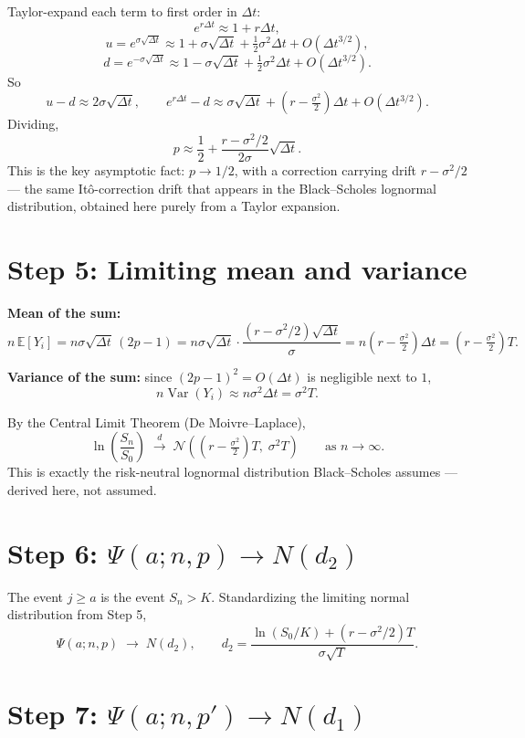 \documentclass[11pt]{article}
\begin{document}
Taylor-expand each term to first order in $\Delta t$:
\[
  e^{r\Delta t} \approx 1 + r\Delta t,
\]
\[
  u = e^{\sigma\sqrt{\Delta t}} \approx 1 + \sigma\sqrt{\Delta t} + \tfrac{1}{2}\sigma^2 \Delta t + O(\Delta t^{3/2}),
\]
\[
  d = e^{-\sigma\sqrt{\Delta t}} \approx 1 - \sigma\sqrt{\Delta t} + \tfrac{1}{2}\sigma^2 \Delta t + O(\Delta t^{3/2}).
\]
So
\[
  u - d \approx 2\sigma\sqrt{\Delta t}, \qquad
  e^{r\Delta t} - d \approx \sigma\sqrt{\Delta t} + \left(r - \tfrac{\sigma^2}{2}\right)\Delta t + O(\Delta t^{3/2}).
\]
Dividing,
\[
  p \approx \frac{1}{2} + \frac{r - \sigma^2/2}{2\sigma}\sqrt{\Delta t}.
\]
This is the key asymptotic fact: $p \to 1/2$, with a correction carrying drift
$r - \sigma^2/2$ --- the same It\^o-correction drift that appears in the Black--Scholes
lognormal distribution, obtained here purely from a Taylor expansion.

\section*{Step 5: Limiting mean and variance}

\textbf{Mean of the sum:}
\[
  n\,\mathbb{E}[Y_i] = n\sigma\sqrt{\Delta t}\,(2p-1)
  = n \sigma \sqrt{\Delta t} \cdot \frac{(r - \sigma^2/2)\sqrt{\Delta t}}{\sigma}
  = n\left(r - \tfrac{\sigma^2}{2}\right)\Delta t
  = \left(r - \tfrac{\sigma^2}{2}\right) T.
\]

\textbf{Variance of the sum:} since $(2p-1)^2 = O(\Delta t)$ is negligible next to $1$,
\[
  n \operatorname{Var}(Y_i) \approx n \sigma^2 \Delta t = \sigma^2 T.
\]

By the Central Limit Theorem (De Moivre--Laplace),
\[
  \ln\!\left(\frac{S_n}{S_0}\right) \;\xrightarrow{d}\;
  \mathcal{N}\!\left( \left(r - \tfrac{\sigma^2}{2}\right) T,\; \sigma^2 T \right)
  \qquad \text{as } n \to \infty.
\]
This is exactly the risk-neutral lognormal distribution Black--Scholes assumes ---
derived here, not assumed.

\section*{Step 6: $\Psi(a; n, p) \to N(d_2)$}

The event $j \ge a$ is the event $S_n > K$. Standardizing the limiting normal
distribution from Step 5,
\[
  \Psi(a; n, p) \;\longrightarrow\; N(d_2), \qquad
  d_2 = \frac{\ln(S_0/K) + \left(r - \sigma^2/2\right) T}{\sigma\sqrt{T}}.
\]

\section*{Step 7: $\Psi(a; n, p') \to N(d_1)$}
\end{document}
